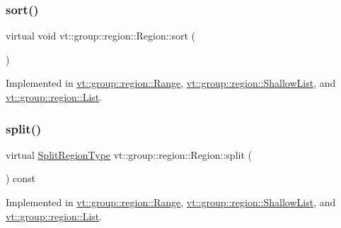 \mbox{\label{structvt_1_1group_1_1region_1_1_region_a169304bf82a87ff958333595bed2603d}} 
\subsubsection{\texorpdfstring{sort()}{sort()}}
{\footnotesize\ttfamily virtual void vt\+::group\+::region\+::\+Region\+::sort (\begin{DoxyParamCaption}{ }\end{DoxyParamCaption})\hspace{0.3cm}{\ttfamily [pure virtual]}}



Implemented in \hyperlink{structvt_1_1group_1_1region_1_1_range_aa24e09be54662ffd11413803689ed7f8}{vt\+::group\+::region\+::\+Range}, \hyperlink{structvt_1_1group_1_1region_1_1_shallow_list_a1c2ba4da8b89771a0361ff34763d7f62}{vt\+::group\+::region\+::\+Shallow\+List}, and \hyperlink{structvt_1_1group_1_1region_1_1_list_acebca171776662bdf481ed1eb7ee4c09}{vt\+::group\+::region\+::\+List}.

\mbox{\label{structvt_1_1group_1_1region_1_1_region_a2cbbbff6358f0f63235d95501858f512}} 
\subsubsection{\texorpdfstring{split()}{split()}}
{\footnotesize\ttfamily virtual \hyperlink{structvt_1_1group_1_1region_1_1_region_ab8d05c0978c7f38292a9ed5a15498a4b}{Split\+Region\+Type} vt\+::group\+::region\+::\+Region\+::split (\begin{DoxyParamCaption}{ }\end{DoxyParamCaption}) const\hspace{0.3cm}{\ttfamily [pure virtual]}}



Implemented in \hyperlink{structvt_1_1group_1_1region_1_1_range_a0d2542edc1fccecc5ba898484f0ccd3f}{vt\+::group\+::region\+::\+Range}, \hyperlink{structvt_1_1group_1_1region_1_1_shallow_list_a766a07e9f1c8580a1b986a71bb80ea66}{vt\+::group\+::region\+::\+Shallow\+List}, and \hyperlink{structvt_1_1group_1_1region_1_1_list_a0f8352e79bb541ad17ea80843a363304}{vt\+::group\+::region\+::\+List}.

